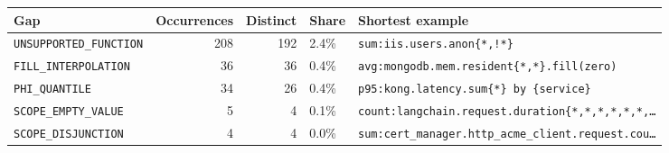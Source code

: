\begin{tabular}{@{}lrrll@{}}
\toprule
Gap & Occurrences & Distinct & Share & Shortest example \\
\midrule
\texttt{UNSUPPORTED\_FUNCTION} & 208 & 192 & 2.4\% & \texttt{sum:iis.users.anon\{*,!*\}} \\
\texttt{FILL\_INTERPOLATION} & 36 & 36 & 0.4\% & \texttt{avg:mongodb.mem.resident\{*,*\}.fill(zero)} \\
\texttt{PHI\_QUANTILE} & 34 & 26 & 0.4\% & \texttt{p95:kong.latency.sum\{*\} by \{service\}} \\
\texttt{SCOPE\_EMPTY\_VALUE} & 5 & 4 & 0.1\% & \texttt{count:langchain.request.duration\{*,*,*,*,*,*,\dots{}} \\
\texttt{SCOPE\_DISJUNCTION} & 4 & 4 & 0.0\% & \texttt{sum:cert\_manager.http\_acme\_client.request.cou\dots{}} \\
\bottomrule
\end{tabular}
